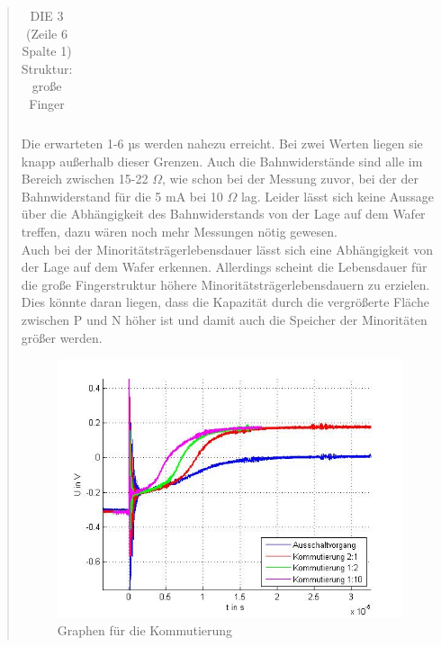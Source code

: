 \begin{quote}
\begin{table}[H]
\begin{addmargin}[3cm]{3cm}
\begin{tabular}{|p{5cm}|p{5cm}|}
                    \end{tabular}
              \end{addmargin}
              \caption{DIE 3 (Zeile 6 Spalte 1) Struktur: große Finger}
              \label{tab:bahnMinfingaus}
            \end{table}

     \vspace{2em}

    Die erwarteten 1-6 µs werden nahezu erreicht. Bei zwei Werten liegen sie
    knapp außerhalb dieser Grenzen. Auch die Bahnwiderstände sind alle im
    Bereich zwischen 15-22 $\Omega$, wie schon bei der Messung zuvor, bei der
    der Bahnwiderstand für die 5 mA bei 10 $\Omega$ lag. Leider lässt sich keine
    Aussage über die Abhängigkeit des Bahnwiderstands von der Lage auf dem
    Wafer treffen, dazu wären noch mehr Messungen nötig gewesen.\\
    Auch bei der Minoritätsträgerlebensdauer lässt sich eine Abhängigkeit von
    der Lage auf dem Wafer erkennen. Allerdings scheint die Lebensdauer für die
    große Fingerstruktur höhere Minoritätsträgerlebensdauern zu erzielen. Dies
    könnte daran liegen, dass die Kapazität durch die vergrößerte Fläche
    zwischen P und N höher ist und damit auch die Speicher der Minoritäten
    größer werden.

    \vspace{2em}

    \begin{figure}[H]
        \centering
        \includegraphics[scale=0.7]{./SchaltverhaltenBilder/Kommutierung_bild.jpg}
        \caption{Graphen für die Kommutierung}
        \label{fig:kommgraph}
    \end{figure}


\end{quote}
